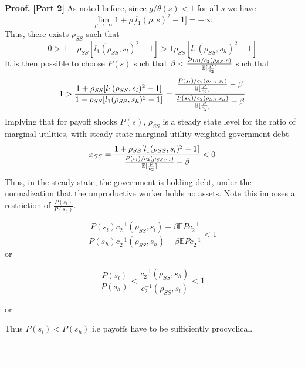 \documentclass[thmsb,11pt]{article}
\newenvironment{proof}[1][Proof]{\noindent \textbf{#1.} }{\  \rule{0.5em}{0.5em}}
\begin{document}
\begin{proof}
\textbf {[Part 2]} As noted before, since $g/\theta (s)<1$ for all $s$ we have
\begin{equation*}
\lim_{\rho \rightarrow \infty }1+\rho \lbrack l_{1}(\rho ,s)^{2}-1]=-\infty
\end{equation*}%
Thus, there exists $\rho_{SS}$ such that
\begin{equation*}
0>1+\rho_{SS}[l_{1}(\rho_{SS},s_{l})^{2}-1]>1\rho_{SS}[l_{1}(\rho_{SS},s_{h})^{2}-1]
\end{equation*}%
It is then possible to choose $P (s)$ such that $\beta <\frac{P(s)/c_{2}(\rho_{SS},s)}{%
\mathbb{E}[\frac{P}{c_{2}}]}$ such that
\begin{equation}
1>\frac{1+\rho_{SS}[l_{1}(\rho_{SS},s_{l})^{2}-1]}{1+\rho_{SS}[l_{1}(\rho_{SS},s_{h})^{2}-1]}=\frac{\frac{P(s_l)/c_{2}(\rho_{SS},s_{l})%
}{\mathbb{E}[\frac{P}{c_{2}}]}-\beta}{\frac{%
P(s_h)/c_{2}(\rho_{SS},s_{h})}{\mathbb{E}[\frac{P}{c_{2}}]}%
-\beta }  \label{eq.beta_cond}
\end{equation}%
Implying that for payoff shocks $P(s)$, $\rho_{SS}$ is a
steady state level for the ratio of marginal utilities, with steady state
marginal utility weighted government debt
\begin{equation*}
x_{SS}=\frac{1+\rho_{SS}[l_{1}(\rho_{SS},s_{l})^{2}-1]}{\frac{%
P(s_l)/c_{2}(\rho_{SS},s_{l})}{\mathbb{E}[\frac{P}{c_{2}}]}%
-\beta}<0
\end{equation*}%
Thus, in the steady state, the government is holding debt, under the
normalization that the unproductive worker holds no assets. Note this imposes a restriction of $\frac{P(s_l)}{P(s_h)}$.

\[\frac{P(s_l)c_2^{-1}(\rho_{SS},s_l)-\beta \mathbb{E}Pc_2^{-1}}{P(s_h)c_2^{-1}(\rho_{SS},s_h)-\beta \mathbb{E}Pc_2^{-1}}<1\]
or

\[\frac{P(s_l)}{P(s_h)}<\frac{c_2^{-1}(\rho_{SS},s_h)}{c_2^{-1}(\rho_{SS},s_l)}<1\]

or

Thus $P(s_l)<P(s_h)$ i.e payoffs have to be sufficiently procyclical.

\end{proof}
\end{document}

